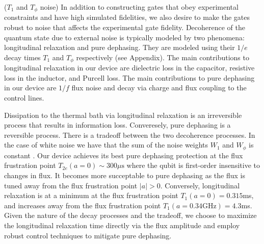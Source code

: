 \documentclass[
  amsfonts,
  amsmath,
  tbtags,
  amssymb,
  aps,
  nobibnotes,
  twocolumn,
  superscriptaddress,
]{revtex4-2}
\begin{document}
($T_{1}$ and $T_{\phi}$ noise)
In addition to constructing gates
that obey experimental constraints and have high simulated fidelities,
we also desire to make the gates robust to noise that affects the experimental
gate fidelity. Decoherence of the quantum state due to external noise
is typically modeled by two phenomena: longitudinal relaxation and pure dephasing.
They are modeled using their $1/e$ decay times $T_{1}$ and $T_{\phi}$ respectively
(see Appendix).
The main contributions to longitudinal relaxation in our
device are dielectric loss in the capacitor, resistive loss in the inductor,
and Purcell loss. The main contributions to pure dephasing in our
device are $1/f$ flux noise and decay via charge and flux coupling
to the control lines.

Dissipation to the thermal bath via longitudinal
relaxation is an irreversible process
that results in information loss.
Converesely, pure dephasing is a reversible process.
There is a tradeoff between the two decoherence processes. In the case of white
noise we have that the sum of the noise weights $W_{1}$ and $W_{\phi}$
is constant \cite{huang2020engineering}.
Our device achieves its best pure dephasing
protection at the flux frustration point
$T_{2e}(a = 0) \sim 300 \mu\textrm{s}$
where the qubit is first-order insensitive to changes in flux.
It becomes more succeptable to pure dephasing as the flux is tuned away from the flux
frustration point $|a| > 0$. Conversely, longitudinal relaxation is at a minimum
at the flux frustration point $T_{1}(a = 0) = 0.315$ms,
and increases away from the flux frustration point
$T_{1}(a = 0.34 \textrm{GHz}) = 4.3$ms. Given the nature
of the decay processes and the tradeoff, we choose
to maximize the longitudinal relaxation time directly
via the flux amplitude and employ robust control techniques to mitigate
pure dephasing.
\end{document}

